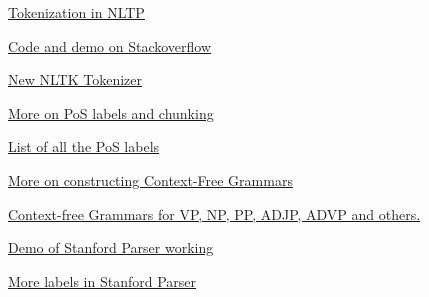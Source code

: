 \documentclass{article}
\begin{document}
 
\begin{thebibliography}{9}
\href{https://www.guru99.com/tokenize-words-sentences-nltk.html}{Tokenization in NLTP}

\href{https://stackoverflow.com/questions/37605710/tokenize-a-paragraph-into-sentence-and-then-into-words-in-nltk}{Code and demo on Stackoverflow}

\href{https://github.com/nltk/nltk/wiki/Stanford-CoreNLP-API-in-NLTK}{New NLTK Tokenizer}

\href{https://nickcdryan.com/2017/02/13/shallow-parsing-for-entity-recognition-with-nltk-and-machine-learning/}{More on PoS labels and chunking}

\href{https://medium.com/@gianpaul.r/tokenization-and-parts-of-speech-pos-tagging-in-pythons-nltk-library-2d30f70af13b}{List of all the PoS labels}

\href{http://courses.washington.edu/ling571/ling571_WIN2015/slides/ling571_class2_grammar.pdf}{More on constructing Context-Free Grammars}

\href{https://people.cs.umass.edu/~brenocon/inlp2017/lectures/16-cfg-exercise.pdf}{Context-free Grammars for VP, NP, PP, ADJP, ADVP and others.}

\href{http://nlp.stanford.edu:8080/parser/index.jsp}{Demo of Stanford Parser working}

\href{https://gist.github.com/nlothian/9240750}{More labels in Stanford Parser}
\end{thebibliography}
\end{document}

